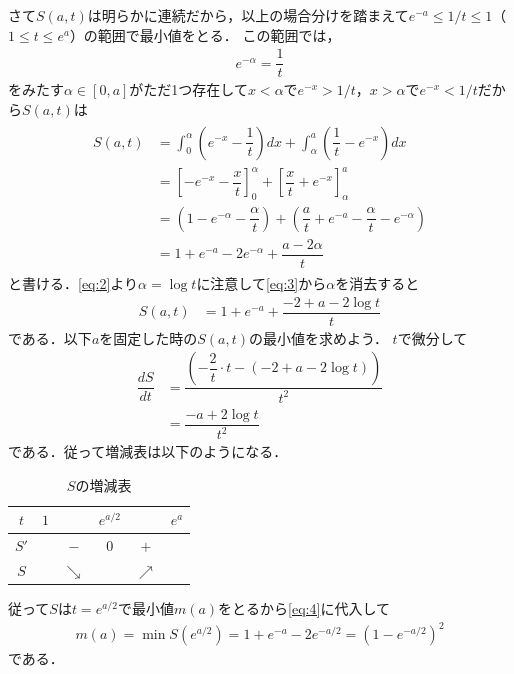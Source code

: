 \documentclass[../../main.tex]{subfiles}
\begin{document}
さて$S(a,t)$は明らかに連続だから，以上の場合分けを踏まえて$e^{-a}\le1/t\le1$（$1\le t\le e^a$）の範囲で最小値をとる．
この範囲では，
\begin{align}
  e^{-\alpha}=\dfrac{1}{t} \label{eq:2}
\end{align}
をみたす$\alpha\in[0,a]$がただ1つ存在して$x<\alpha$で$e^{-x}>1/t$，$x>\alpha$で$e^{-x}<1/t$だから$S(a,t)$は
\begin{align}
  \begin{split}
    S(a,t)
    &=\int_0^\alpha\left(e^{-x}-\dfrac{1}{t}\right)dx+\int_\alpha^a\left(\dfrac{1}{t}-e^{-x}\right)dx \\
    &=\left[-e^{-x}-\dfrac{x}{t}\right]_0^\alpha+\left[\dfrac{x}{t}+e^{-x}\right]_\alpha^a \\
    &=\left(1-e^{-\alpha}-\dfrac{\alpha}{t}\right)+\left(\dfrac{a}{t}+e^{-a}-\dfrac{\alpha}{t}-e^{-\alpha}\right) \\
    &=1+e^{-a}-2e^{-\alpha}+\dfrac{a-2\alpha}{t}
  \end{split} \label{eq:3}
\end{align}
と書ける．\cref{eq:2}より$\alpha = \log t$に注意して\cref{eq:3}から$\alpha$を消去すると
\begin{align}
  S(a,t)
  &= 1+e^{-a}+\dfrac{-2+a-2\log t}{t} \label{eq:4}
\end{align}
である．以下$a$を固定した時の$S(a,t)$の最小値を求めよう．
$t$で微分して
\begin{align}
  \dfrac{dS}{dt}
  &= \dfrac{\left(-\dfrac{2}{t}\cdot t -\left(-2+a-2\log t\right) \right)}{t^2} \\
  &= \dfrac{- a + 2\log t}{t^2}
\end{align}
である．従って増減表は以下のようになる．

\begin{table}[htb]
  \centering
  \caption{$S$の増減表}
  \begin{tabular}{c|ccccc}
    $t$ & $1$ & & $e^{a/2}$ & & $e^a$ \\
    \hline
    $S'$ & & $-$ & $0$ & $+$ & \\
    \hline
    $S$ & & $\searrow$ & & $\nearrow$ &
  \end{tabular}
\end{table}

従って$S$は$t=e^{a/2}$で最小値$m(a)$をとるから\cref{eq:4}に代入して
\begin{align}
  m(a)=\min S\left(e^{a/2}\right) = 1+e^{-a}-2e^{-a/2}=\left(1-e^{-a/2}\right)^2
\end{align}
である．
\end{document}
